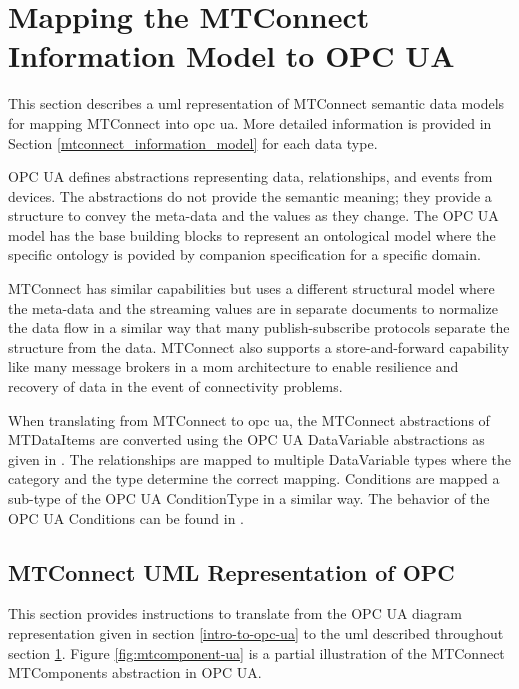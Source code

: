 \clearpage
\section{Mapping the MTConnect Information Model to OPC UA} 
\label{mtconnect-mapping}

This section describes a \gls{uml} representation of MTConnect semantic data models for mapping MTConnect into \gls{opc} \gls{ua}. More detailed information is provided in Section \ref{mtconnect_information_model} for each data type.

OPC UA defines abstractions representing data, relationships, and events from devices. The abstractions do not provide the semantic meaning; they provide a structure to convey the meta-data and the values as they change. The OPC UA model has the base building blocks to represent an ontological model where the specific ontology is povided by companion specification for a specific domain.

MTConnect has similar capabilities but uses a different structural model where the meta-data and the streaming values are in separate documents to normalize the data flow in a similar way that many publish-subscribe protocols separate the structure from the data. MTConnect also supports a store-and-forward capability like many message brokers in a \gls{mom} architecture to enable resilience and recovery of data in the event of connectivity problems.

When translating from MTConnect to \gls{opc} \gls{ua}, the MTConnect abstractions of \glspl{MTDataItem} are converted using the OPC UA  \gls{DataVariable} abstractions as given in \cite{UAPart8}.  The relationships are mapped to multiple \gls{DataVariable} types where the category and the type determine the correct mapping. Conditions are mapped a sub-type of the OPC UA \gls{ConditionType} in a similar way. The behavior of the OPC UA \glspl{Condition} can be found in \cite{UAPart9}.

\subsection{MTConnect UML Representation of OPC}

This section provides instructions to translate from the OPC UA diagram representation given in section \ref{intro-to-opc-ua} to the \gls{uml} described throughout section \ref{mtconnect-mapping}. Figure \ref{fig:mtcomponent-ua} is a partial illustration of the MTConnect \glspl{MTComponent} abstraction in OPC UA.

